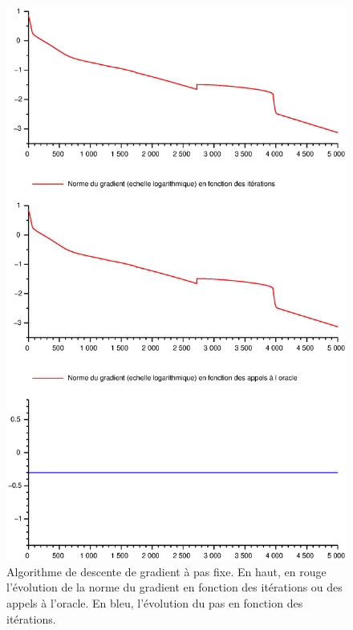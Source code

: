 \documentclass[11pt]{article}
\begin{document}
\begin{figure}[H]
  \centering
    \includegraphics[width=0.95 \textwidth]{Images/Lagrange_pas_fixe.eps}
  \caption{Algorithme de descente de gradient à pas fixe. En haut, en rouge l'évolution de la norme du gradient en fonction des itérations ou des appels à l'oracle. En bleu, l'évolution du pas en fonction des itérations.}
\end{figure}
\end{document}
